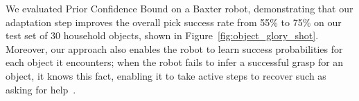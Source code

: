 \documentclass{article}
\newcommand{\algorithmDTxt}{Prior Confidence Bound\xspace}
\begin{document}



We evaluated \algorithmDTxt on a Baxter robot, demonstrating that our
adaptation step improves the overall pick success rate from 55\% to
75\% on our test set of 30 household objects, shown in
Figure~\ref{fig:object_glory_shot}.  Moreover, our approach also
enables the robot to learn success probabilities for each object it
encounters; when the robot fails to infer a successful grasp for an
object, it knows this fact, enabling it to take active steps to
recover such as asking for help~\citep{tellex14}.
\end{document}
